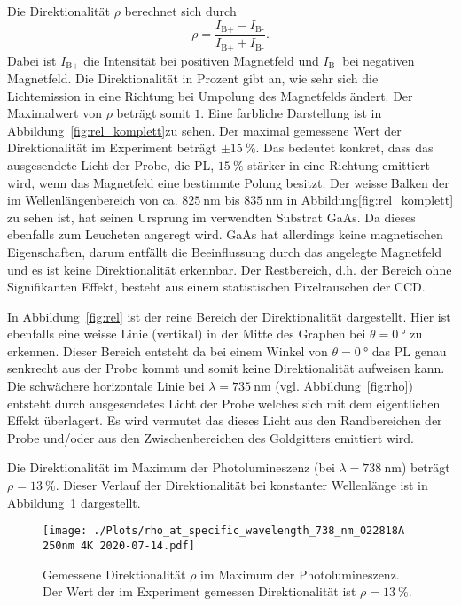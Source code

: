 Die Direktionalität $\rho$ berechnet sich durch 
\begin{equation}
    \rho = \frac{I_\text{B+} - I_\text{B-} }{ I_\text{B+} + I_\text{B-} }.
\end{equation}
Dabei ist $I_\text{B+}$ die Intensität bei positiven Magnetfeld und $I_\text{B-}$ bei negativen Magnetfeld.
Die Direktionalität in Prozent gibt an, wie sehr sich die Lichtemission in eine Richtung bei Umpolung des Magnetfelds ändert. 
Der Maximalwert von $\rho$ beträgt somit $1$.
Eine farbliche Darstellung ist in Abbildung~\ref{fig:rel_komplett}zu sehen.
Der maximal gemessene Wert der Direktionalität im Experiment beträgt $\pm \SI{15}{\percent}$. 
Das bedeutet konkret, dass das ausgesendete Licht der Probe, die PL, $\SI{15}{\percent}$ stärker in eine Richtung
emittiert wird, wenn das Magnetfeld eine bestimmte Polung besitzt.
Der weisse Balken der im Wellenlängenbereich von ca. $\SI{825}{\nano\meter}$ bis $\SI{835}{\nano\meter}$ 
in Abbildung\ref{fig:rel_komplett} zu sehen ist, 
hat seinen Ursprung im verwendten Substrat GaAs. Da dieses ebenfalls zum Leucheten angeregt wird.
GaAs hat allerdings keine magnetischen Eigenschaften, darum entfällt die Beeinflussung durch das angelegte Magnetfeld
und es ist keine Direktionalität erkennbar.
Der Restbereich, d.h. der Bereich ohne Signifikanten Effekt, besteht aus einem statistischen Pixelrauschen der CCD.

In Abbildung~\ref{fig:rel} ist der reine Bereich der Direktionalität dargestellt.
Hier ist ebenfalls eine weisse Linie (vertikal) in der Mitte des Graphen bei $\theta = \SI{0}{\degree}$ zu erkennen.
Dieser Bereich entsteht da bei einem Winkel von $\theta = \SI{0}{\degree}$ das PL genau senkrecht aus der Probe kommt
und somit keine Direktionalität aufweisen kann.
Die schwächere horizontale Linie bei $\lambda = \SI{735}{\nano\meter}$ 
(vgl. Abbildung~\ref{fig:rho}) entsteht durch 
ausgesendetes Licht der Probe welches sich mit dem eigentlichen Effekt überlagert. 
Es wird vermutet das dieses Licht aus den Randbereichen der Probe und/oder aus den Zwischenbereichen des Goldgitters 
emittiert wird.

Die Direktionalität im Maximum der Photolumineszenz (bei $\lambda = \SI{738}{\nano\meter}$) beträgt
$\rho = \SI{13}{\percent}$. 
Dieser Verlauf der Direktionalität bei konstanter Wellenlänge ist in Abbildung~\ref{fig:dir} dargestellt.
\begin{figure}
    \centering
    \texttt{[image: ./Plots/rho\_at\_specific\_wavelength\_738\_nm\_022818A 250nm 4K 2020-07-14.pdf]}
    \caption{Gemessene Direktionalität $\rho$ im Maximum der Photolumineszenz.
    Der Wert der im Experiment gemessen Direktionalität ist $\rho = \SI{13}{\percent}$.}
    \label{fig:dir}
\end{figure}
\FloatBarrier


